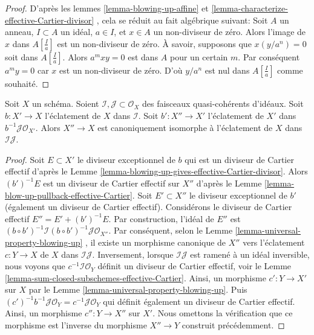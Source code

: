 \begin{proof}
D'après les lemmes  \ref{lemma-blowing-up-affine}  et  \ref{lemma-characterize-effective-Cartier-divisor} , cela se réduit au fait algébrique
suivant: Soit  $A$  un anneau,  $I \subset A$  un idéal,  $a \in I$, et
 $x \in A$  un non-diviseur de zéro. Alors l'image de  $x$  dans
 $A[\frac{I}{a}]$  est un non-diviseur de zéro. À savoir, supposons que  $x (y/a^n) = 0$ 
soit dans  $A[\frac{I}{a}]$. Alors  $a^mxy = 0$  est dans  $A$  pour un certain
 $m$. Par conséquent  $a^my = 0$  car  $x$  est un non-diviseur de
zéro. D'où  $y/a^n$  est nul dans  $A[\frac{I}{a}]$  comme souhaité.
\end{proof}

\begin{lemma}
\label{lemma-blowing-up-two-ideals}
Soit  $X$  un schéma. Soient  $\mathcal{I}, \mathcal{J} \subset \mathcal{O}_X$  des faisceaux quasi-cohérents
d'idéaux. Soit  $b : X' \to X$  l'éclatement de  $X$  dans  $\mathcal{I}$. Soit
 $b' : X'' \to X'$  l'éclatement de  $X'$  dans  $b^{-1}\mathcal{J} \mathcal{O}_{X'}$. Alors  $X'' \to X$ 
est canoniquement isomorphe à l'éclatement de  $X$  dans  $\mathcal{I}\mathcal{J}$.
\end{lemma}

\begin{proof}
Soit  $E \subset X'$  le diviseur exceptionnel de  $b$  qui est un diviseur de
Cartier effectif d'après le Lemme  \ref{lemma-blowing-up-gives-effective-Cartier-divisor}. Alors  $(b')^{-1}E$  est un diviseur
de Cartier effectif sur  $X''$  d'après le Lemme  \ref{lemma-blow-up-pullback-effective-Cartier}. Soit
 $E' \subset X''$  le diviseur exceptionnel de  $b'$  (également un diviseur de
Cartier effectif). Considérons le diviseur de Cartier effectif  $E'' = E' + (b')^{-1}E$. Par
construction, l'idéal de  $E''$  est  $(b \circ b')^{-1}\mathcal{I} (b \circ b')^{-1}\mathcal{J} \mathcal{O}_{X''}$. Par conséquent, selon le
Lemme  \ref{lemma-universal-property-blowing-up} , il existe un morphisme canonique de  $X''$  vers
l'éclatement  $c : Y \to X$  de  $X$  dans  $\mathcal{I}\mathcal{J}$. Inversement, lorsque
 $\mathcal{I}\mathcal{J}$  est ramené à un idéal inversible, nous voyons que  $c^{-1}\mathcal{I}\mathcal{O}_Y$ 
définit un diviseur de Cartier effectif, voir le Lemme  \ref{lemma-sum-closed-subschemes-effective-Cartier}. Ainsi, un
morphisme  $c' : Y \to X'$  sur  $X$  par le Lemme  \ref{lemma-universal-property-blowing-up}. Puis
 $(c')^{-1}b^{-1}\mathcal{J}\mathcal{O}_Y = c^{-1}\mathcal{J}\mathcal{O}_Y$  qui définit également un diviseur de Cartier effectif. Ainsi, un
morphisme  $c'' : Y \to X''$  sur  $X'$. Nous omettons la vérification que ce
morphisme est l'inverse du morphisme  $X'' \to Y$  construit précédemment.
\end{proof}

